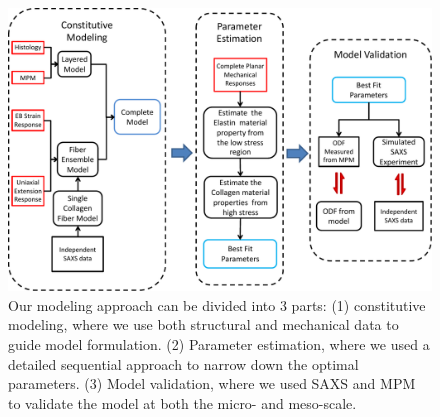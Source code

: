 \begin{figure}
\centering
\includegraphics[width=\textwidth]{Images/chapter2/figure1.pdf}
\caption{Our modeling approach can be divided into 3 parts: (1) constitutive modeling, where we use both structural and mechanical data to guide model formulation. (2) Parameter estimation, where we used a detailed sequential approach to narrow down the optimal parameters. (3) Model validation, where we used SAXS and MPM to validate the model at both the micro- and meso-scale.}
\label{c2:fig:1}
\end{figure}






